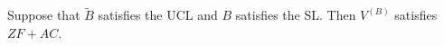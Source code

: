 Suppose that $\tilde{B}$ satisfies the UCL and $B$ satisfies the SL. Then $V^{(B)}$ satisfies $ZF + AC$.
